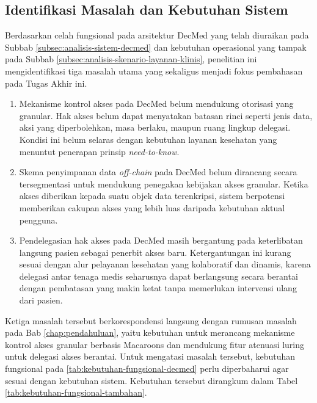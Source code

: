 \subsection{Identifikasi Masalah dan Kebutuhan Sistem}
\label{subsec:identifikasi-masalah}
Berdasarkan celah fungsional pada arsitektur DecMed yang telah diuraikan pada Subbab \ref{subsec:analisis-sistem-decmed} dan kebutuhan operasional yang tampak pada Subbab \ref{subsec:analisis-skenario-layanan-klinis}, penelitian ini mengidentifikasi tiga masalah utama yang sekaligus menjadi fokus pembahasan pada Tugas Akhir ini.

\begin{enumerate}[leftmargin=*]
	\item Mekanisme kontrol akses pada DecMed belum mendukung otorisasi yang granular. Hak akses belum dapat menyatakan batasan rinci seperti jenis data, aksi yang diperbolehkan, masa berlaku, maupun ruang lingkup delegasi. Kondisi ini belum selaras dengan kebutuhan layanan kesehatan yang menuntut penerapan prinsip \textit{need-to-know}.
	\item Skema penyimpanan data \textit{off-chain} pada DecMed belum dirancang secara tersegmentasi untuk mendukung penegakan kebijakan akses granular. Ketika akses diberikan kepada suatu objek data terenkripsi, sistem berpotensi memberikan cakupan akses yang lebih luas daripada kebutuhan aktual pengguna.
	\item Pendelegasian hak akses pada DecMed masih bergantung pada keterlibatan langsung pasien sebagai penerbit akses baru. Ketergantungan ini kurang sesuai dengan alur pelayanan kesehatan yang kolaboratif dan dinamis, karena delegasi antar tenaga medis seharusnya dapat berlangsung secara berantai dengan pembatasan yang makin ketat tanpa memerlukan intervensi ulang dari pasien.
\end{enumerate}

Ketiga masalah tersebut berkorespondensi langsung dengan rumusan masalah pada Bab \ref{chap:pendahuluan}, yaitu kebutuhan untuk merancang mekanisme kontrol akses granular berbasis Macaroons dan mendukung fitur atenuasi luring untuk delegasi akses berantai. Untuk mengatasi masalah tersebut, kebutuhan fungsional pada \ref{tab:kebutuhan-fungsional-decmed} perlu diperbaharui agar sesuai dengan kebutuhan sistem. Kebutuhan tersebut dirangkum dalam Tabel \ref{tab:kebutuhan-fungsional-tambahan}.

